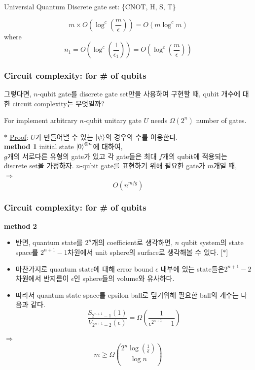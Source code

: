 \documentclass[9pt]{beamer}
\begin{document}
\begin{section}{Universial Quantum Discrete gate set: \{CNOT, H, S, T\}}
\begin{frame}
            \begin{theorem}
                $$ m \times O\left(\log^c \left( \frac{m}{\epsilon} \right)\right) = O(m \log^c m)$$
                where
                $$n_1 = O\left(\log^c \left( \frac{1}{\epsilon_1} \right)\right) = O\left(\log^c \left( \frac{m}{\epsilon} \right)\right) $$
            \end{theorem}
        \end{frame}


        \begin{frame}
            \frametitle{Circuit complexity: for \# of qubits}
            그렇다면, $n$-qubit gate를 discrete gate set만을 사용하여 구현할 때, qubit 개수에 대한 circuit complexity는 무엇일까?
            \begin{theorem}
                For implement arbitrary $n$-qubit unitary gate $U$ needs $\Omega(2^n)$ number of gates.
            \end{theorem}
            \vspace{0.2cm}
            $\ast$ \underline{Proof}: $U$가 만들어낼 수 있는 $\ket \psi$의 경우의 수를 이용한다.
            \vspace{0.3cm}
            \\ \textbf{method 1} initial state $\ket{0}^{\otimes n}$에 대하여,
            \\ $g$개의 서로다른 유형의 gate가 있고 각 gate들은 최대 $f$개의 qubit에 적용되는 discrete set을 가정하자. $n$-qubit gate를 표현하기 위해 필요한 gate가 $m$개일 때,
            \\ $\Rightarrow$
            \vspace{2cm}
            $$O(n^{mfg})$$
        \end{frame}

        \begin{frame}
            \frametitle{Circuit complexity: for \# of qubits}
            \textbf{method 2}
            \begin{itemize}
                \item 반면, quantum state를 $2^n$개의 coefficient로 생각하면, $n$ qubit system의 state space를 $2^{n+1}-1$차원에서 unit sphere의 surface로 생각해볼 수 있다. [$\ast$] %
                \item 마찬가지로 quantum state에 대해 error bound $\epsilon$ 내부에 있는 state들은$2^{n+1}-2$차원에서 반지름이 $\epsilon$인 sphere들의 volume와 유사하다.
                \item 따라서 quantum state space를 epsilon ball로 덮기위해 필요한 ball의 개수는 다음과 같다.
                $$\frac{S_{2^{n+1}-1}(1)}{V_{2^{n+1}-2}(\epsilon)} = \Omega\left( \frac{1}{\epsilon^{2^{n+1}}-1} \right)$$
            \end{itemize}
            \vspace{0.5cm}
            $\Rightarrow$
            \vspace{1.5cm}
            $$\boxed{m \ge \Omega\left( \frac{2^n \log\left( \frac{1}{\epsilon} \right)}{\log n} \right)}$$


\end{frame}
\end{section}
\end{document}
